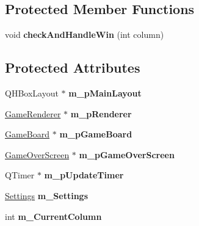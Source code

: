 \subsection*{\-Protected \-Member \-Functions}
\begin{DoxyCompactItemize}
\item 
\hypertarget{classGameManager_a4d65975808a9ddce05814b0708b11268}{void {\bfseries check\-And\-Handle\-Win} (int column)}\label{classGameManager_a4d65975808a9ddce05814b0708b11268}

\end{DoxyCompactItemize}
\subsection*{\-Protected \-Attributes}
\begin{DoxyCompactItemize}
\item 
\hypertarget{classGameManager_aee76ef2de914b2c0934c5b3264426edb}{\-Q\-H\-Box\-Layout $\ast$ {\bfseries m\-\_\-p\-Main\-Layout}}\label{classGameManager_aee76ef2de914b2c0934c5b3264426edb}

\item 
\hypertarget{classGameManager_af15f419d79f18cf1bfb846633fa60ea6}{\hyperlink{classGameRenderer}{\-Game\-Renderer} $\ast$ {\bfseries m\-\_\-p\-Renderer}}\label{classGameManager_af15f419d79f18cf1bfb846633fa60ea6}

\item 
\hypertarget{classGameManager_af8185baa9bd771d56187bfe21a35bcca}{\hyperlink{classGameBoard}{\-Game\-Board} $\ast$ {\bfseries m\-\_\-p\-Game\-Board}}\label{classGameManager_af8185baa9bd771d56187bfe21a35bcca}

\item 
\hypertarget{classGameManager_a8f611fd41149c74160bf1314d3c8ce09}{\hyperlink{classGameOverScreen}{\-Game\-Over\-Screen} $\ast$ {\bfseries m\-\_\-p\-Game\-Over\-Screen}}\label{classGameManager_a8f611fd41149c74160bf1314d3c8ce09}

\item 
\hypertarget{classGameManager_acc65f12646b0b5f041685066da3d5e7e}{\-Q\-Timer $\ast$ {\bfseries m\-\_\-p\-Update\-Timer}}\label{classGameManager_acc65f12646b0b5f041685066da3d5e7e}

\item 
\hypertarget{classGameManager_a333d215d519fe0789a64c369bdb7a4ee}{\hyperlink{structSettings}{\-Settings} {\bfseries m\-\_\-\-Settings}}\label{classGameManager_a333d215d519fe0789a64c369bdb7a4ee}

\item 
\hypertarget{classGameManager_a85d58e6dbc954f0441fb5fdb8c797564}{int {\bfseries m\-\_\-\-Current\-Column}}\label{classGameManager_a85d58e6dbc954f0441fb5fdb8c797564}


\end{DoxyCompactItemize}
